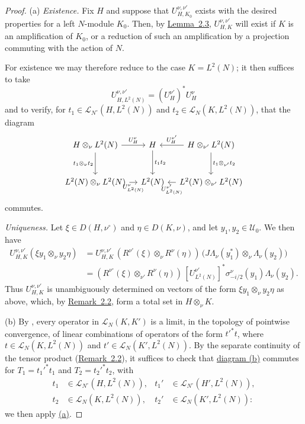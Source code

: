 \documentclass[fontsize=13pt,twoside,headings=small,bookmarkpackage=false]{scrartcl}
\newcommand{\Lop}{\mathcal L}
\begin{document}
\begin{proof}
(a) \emph{Existence.} Fix $H$ and suppose that $U_{H,K_0}^{\nu,\nu'}$ exists with the desired properties for a left $N$-module $K_0$. Then, by \hyperref[p:2.3]{Lemma~2.3}, $U_{H,K}^{\nu,\nu'}$ will exist if $K$ is an amplification of $K_0$, or a reduction of such an amplification by a projection commuting with the action of $N$.

For existence we may therefore reduce to the case $K=L^2(N)$; it then suffices to take
\[
U_{H,L^2(N)}^{\nu,\nu'}=(U_H^{\nu'})^*U_H^\nu
\]
and to verify, for $t_1\in\Lop_{N^\circ}(H,L^2(N))$ and $t_2\in\Lop_N(K,L^2(N))$, that the diagram
\[
\begin{tikzcd}[column sep=1em,row sep=large]
H\otimes_\nu L^2(N)\arrow[r,"U_H^\nu"]\arrow[d,"t_1\otimes_\nu t_2"']
&H\arrow[d,"t_1t_2"]
&H\otimes_{\nu'}L^2(N)\arrow[l,"U_H^{\nu'}"']\arrow[d,"t_1\otimes_{\nu'}t_2"]\\
L^2(N)\otimes_\nu L^2(N)\arrow[r,"U_{L^2(N)}^\nu"']
&L^2(N)
&L^2(N)\otimes_{\nu'}L^2(N)\arrow[l,"U_{L^2(N)}^{\nu'}"]
\end{tikzcd}
\]
commutes.

\emph{Uniqueness.} Let $\xi\in D(H,\nu^\circ)$ and $\eta\in D(K,\nu)$, and let $y_1,y_2\in\mathcal U_0$. We then have
\begin{align*}
U_{H,K}^{\nu,\nu'}(\xi y_1\otimes_\nu y_2\eta)
&=U_{H,K}^{\nu,\nu'}\,(R^{\nu^\circ}(\xi)\otimes_\nu R^\nu(\eta))\,
\bigl(J\Lambda_\nu(y_1^*)\otimes_\nu\Lambda_\nu(y_2)\bigr)\\
&=(R^{\nu^\circ}(\xi)\otimes_{\nu'}R^\nu(\eta))\,
[U_{L^2(N)}^{\nu'}]^*\sigma^\nu_{-i/2}(y_1)\Lambda_\nu(y_2).
\end{align*}
Thus $U_{H,K}^{\nu,\nu'}$ is unambiguously determined on vectors of the form $\xi y_1\otimes_\nu y_2\eta$ as above, which, by \hyperref[p:2.2]{Remark~2.2}, form a total set in $H\otimes_\nu K$.

(b) By \cite[Proposition~3(b)]{1}, every operator in $\Lop_N(K,K')$ is a limit, in the topology of pointwise convergence, of linear combinations of operators of the form $t'^*t$, where $t\in\Lop_N(K,L^2(N))$ and $t'\in\Lop_N(K',L^2(N))$. By the separate continuity of the tensor product (\hyperref[p:2.2]{Remark~2.2}), it suffices to check that \hyperlink{diagram:2.6b}{diagram (b)} commutes for $T_1=t_1'^*t_1$ and $T_2=t_2'^*t_2$, with
\begin{align*}
t_1&\in\Lop_{N^\circ}(H,L^2(N)),&
t_1'&\in\Lop_{N^\circ}(H',L^2(N)),\\
t_2&\in\Lop_N(K,L^2(N)),&
t_2'&\in\Lop_N(K',L^2(N)):
\end{align*}
we then apply \hyperlink{part:2.6a}{(a)}.
\end{proof}
\end{document}

